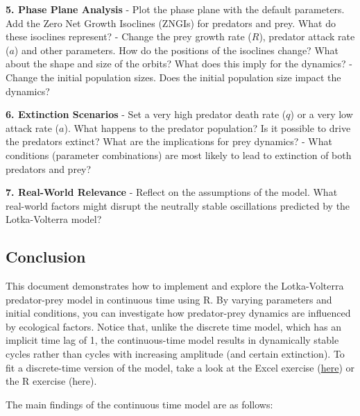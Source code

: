 \documentclass[
  a4paper]{book}
\begin{document}
\textbf{5. Phase Plane Analysis}
- Plot the phase plane with the default parameters. Add the Zero Net Growth Isoclines (ZNGIs) for predators and prey. What do these isoclines represent?
- Change the prey growth rate (\(R\)), predator attack rate (\(a\)) and other parameters. How do the positions of the isoclines change? What about the shape and size of the orbits? What does this imply for the dynamics?
- Change the initial population sizes. Does the initial population size impact the dynamics?

\textbf{6. Extinction Scenarios}
- Set a very high predator death rate (\(q\)) or a very low attack rate (\(a\)). What happens to the predator population? Is it possible to drive the predators extinct? What are the implications for prey dynamics?
- What conditions (parameter combinations) are most likely to lead to extinction of both predators and prey?

\textbf{7. Real-World Relevance}
- Reflect on the assumptions of the model. What real-world factors might disrupt the neutrally stable oscillations predicted by the Lotka-Volterra model?

\subsection{Conclusion}\label{conclusion}

This document demonstrates how to implement and explore the Lotka-Volterra predator-prey model in continuous time using R. By varying parameters and initial conditions, you can investigate how predator-prey dynamics are influenced by ecological factors. Notice that, unlike the discrete time model, which has an implicit time lag of 1, the continuous-time model results in dynamically stable cycles rather than cycles with increasing amplitude (and certain extinction). To fit a discrete-time version of the model, take a look at the Excel exercise (\href{https://jonesor.github.io/BB512_Book/lotka-volterra-predator-prey-dynamics.html}{here}) or the R exercise (here).

The main findings of the continuous time model are as follows:
\end{document}
